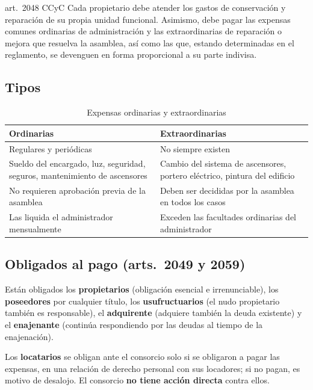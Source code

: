 \documentclass[12pt,oneside]{book}
\begin{document}
\begin{regla}{art.~2048 CCyC}
Cada propietario debe atender los gastos de conservación y reparación de su propia unidad funcional. Asimismo, debe pagar las expensas comunes ordinarias de administración y las extraordinarias de reparación o mejora que resuelva la asamblea, así como las que, estando determinadas en el reglamento, se devenguen en forma proporcional a su parte indivisa.
\end{regla}

\subsection{Tipos}

\begin{table}[H]
\centering
\small
\begin{tabularx}{\textwidth}{>{\raggedright\arraybackslash}X>{\raggedright\arraybackslash}X}
\toprule
\textbf{Ordinarias} & \textbf{Extraordinarias} \\
\midrule
Regulares y periódicas & No siempre existen \\
Sueldo del encargado, luz, seguridad, seguros, mantenimiento de ascensores & Cambio del sistema de ascensores, portero eléctrico, pintura del edificio \\
No requieren aprobación previa de la asamblea & Deben ser decididas por la asamblea en todos los casos \\
Las liquida el administrador mensualmente & Exceden las facultades ordinarias del administrador \\
\bottomrule
\end{tabularx}
\caption{Expensas ordinarias y extraordinarias}
\end{table}

\subsection{Obligados al pago (arts.~2049 y 2059)}

Están obligados los \textbf{propietarios} (obligación esencial e irrenunciable), los \textbf{poseedores} por cualquier título, los \textbf{usufructuarios} (el nudo propietario también es responsable), el \textbf{adquirente} (adquiere también la deuda existente) y el \textbf{enajenante} (continúa respondiendo por las deudas al tiempo de la enajenación).

\begin{importante}
Los \textbf{locatarios} se obligan ante el consorcio solo si se obligaron a pagar las expensas, en una relación de derecho personal con sus locadores; si no pagan, es motivo de desalojo. El consorcio \textbf{no tiene acción directa} contra ellos.
\end{importante}
\end{document}
